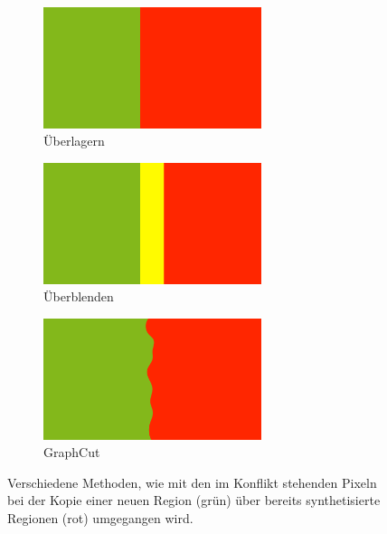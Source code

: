 \begin{figure}
	\centering
	\begin{subfigure}{0.3\textwidth}
		\centering
		\includegraphics[width=0.7\textwidth]{images/patchbased-overlay}
		\caption{Überlagern}
	\end{subfigure}
	\hfill
	\begin{subfigure}{0.3\textwidth}
		\centering
		\includegraphics[width=0.7\textwidth]{images/patchbased-blending}
		\caption{Überblenden}
	\end{subfigure}
	\hfill
	\begin{subfigure}{0.3\textwidth}
		\centering
		\includegraphics[width=0.7\textwidth]{images/patchbased-graphcut}
		\caption{GraphCut}
	\end{subfigure}
	
	\caption{
		Verschiedene Methoden, wie mit den im Konflikt stehenden Pixeln bei der Kopie einer neuen Region (grün) über bereits synthetisierte Regionen (rot) umgegangen wird.
	}
	\label{regionsbasiert}
\end{figure}

